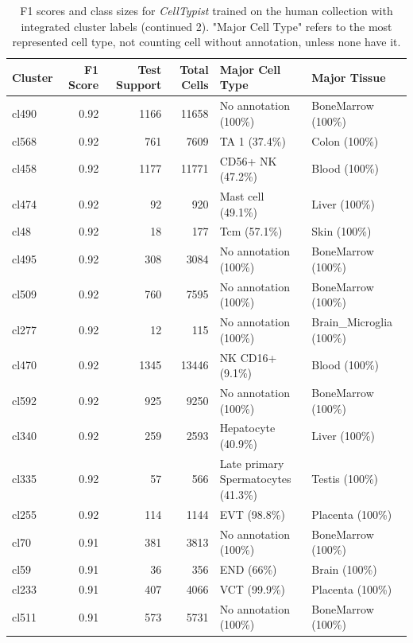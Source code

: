 \begin{table}[ht!]
\scriptsize
\caption[F1 scores and class sizes for \textit{CellTypist} trained on the human collection with integrated cluster labels (continued 2)]{F1 scores and class sizes for \textit{CellTypist} trained on the human collection with integrated cluster labels (continued 2). "Major Cell Type" refers to the most represented cell type, not counting cell without annotation, unless none have it.}
\centering
\label{table:tab_HAmodelclust2}
\begin{tabular}{lrrrll}
  \toprule
Cluster & F1 Score & Test Support & Total Cells & Major Cell Type & Major Tissue \\ 
  \midrule    
  cl490 & 0.92 & 1166 & 11658 & No annotation (100\%) & BoneMarrow (100\%) \\ 
  cl568 & 0.92 & 761 & 7609 & TA 1 (37.4\%) & Colon (100\%) \\ 
  cl458 & 0.92 & 1177 & 11771 & CD56+ NK (47.2\%) & Blood (100\%) \\ 
  cl474 & 0.92 &  92 & 920 & Mast cell (49.1\%) & Liver (100\%) \\ 
  cl48 & 0.92 &  18 & 177 & Tcm (57.1\%) & Skin (100\%) \\ 
  cl495 & 0.92 & 308 & 3084 & No annotation (100\%) & BoneMarrow (100\%) \\ 
  cl509 & 0.92 & 760 & 7595 & No annotation (100\%) & BoneMarrow (100\%) \\ 
  cl277 & 0.92 &  12 & 115 & No annotation (100\%) & Brain\_Microglia (100\%) \\ 
  cl470 & 0.92 & 1345 & 13446 & NK CD16+ (9.1\%) & Blood (100\%) \\ 
  cl592 & 0.92 & 925 & 9250 & No annotation (100\%) & BoneMarrow (100\%) \\ 
  cl340 & 0.92 & 259 & 2593 & Hepatocyte (40.9\%) & Liver (100\%) \\ 
  cl335 & 0.92 &  57 & 566 & \specialcell[t]{Late primary\\Spermatocytes (41.3\%)} & Testis (100\%) \\ 
  cl255 & 0.92 & 114 & 1144 & EVT (98.8\%) & Placenta (100\%) \\ 
  cl70 & 0.91 & 381 & 3813 & No annotation (100\%) & BoneMarrow (100\%) \\ 
  cl59 & 0.91 &  36 & 356 & END (66\%) & Brain (100\%) \\ 
  cl233 & 0.91 & 407 & 4066 & VCT (99.9\%) & Placenta (100\%) \\ 
  cl511 & 0.91 & 573 & 5731 & No annotation (100\%) & BoneMarrow (100\%) \\ 

\end{tabular}
\end{table}
